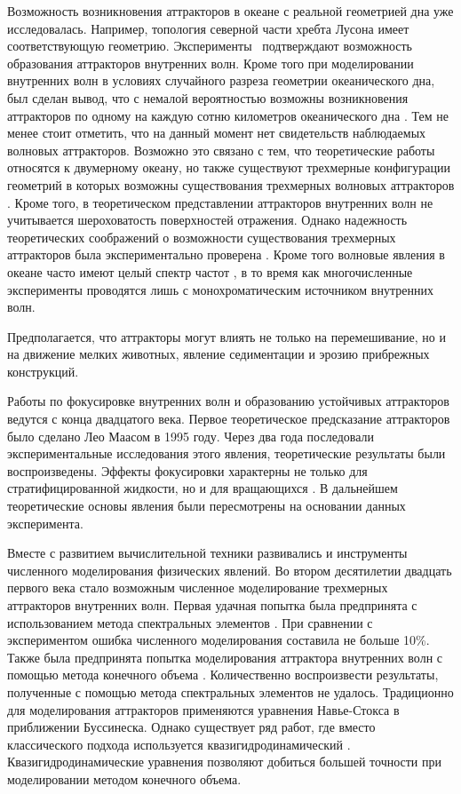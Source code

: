 Возможность возникновения аттракторов в океане с реальной геометрией дна уже исследовалась\cite{Tang2010}. Например, топология северной части хребта Лусона имеет соответствующую геометрию. Эксперименты~\cite{ECHEVERRI2011} подтверждают возможность образования аттракторов внутренних волн. Кроме того при моделировании внутренних волн в условиях случайного разреза геометрии океанического дна, был сделан вывод, что с немалой вероятностью возможны возникновения аттракторов по одному на каждую сотню километров океанического дна \cite{Guo2015}. Тем не менее стоит отметить, что на данный момент нет свидетельств наблюдаемых волновых аттракторов. Возможно это связано с тем, что теоретические работы \cite{Guo2015} относятся к двумерному океану, но также существуют трехмерные конфигурации геометрий в которых возможны существования трехмерных волновых аттракторов \cite{Drijfhout2007,Manders2004}. Кроме того, в теоретическом представлении аттракторов внутренних волн не учитывается шероховатость поверхностей отражения. Однако надежность теоретических соображений о возможности существования трехмерных аттракторов была экспериментально проверена \cite{Hazewinkel2010}. Кроме того волновые явления в океане часто имеют целый спектр частот \cite{Garrett1972}, в то время как многочисленные эксперименты проводятся лишь с монохроматическим источником внутренних волн.

Предполагается, что аттракторы могут влиять не только на перемешивание, но и на движение мелких животных, явление седиментации и эрозию прибрежных конструкций.

Работы по фокусировке внутренних волн и образованию устойчивых аттракторов ведутся с конца двадцатого века. Первое теоретическое предсказание аттракторов было сделано Лео Маасом в 1995 году\cite{Maas1995}. Через два года последовали экспериментальные исследования этого явления, теоретические результаты были воспроизведены\cite{Maas1997}. Эффекты фокусировки характерны не только для стратифицированной жидкости, но и для вращающихся \cite{articleMaas2003,Veronis1970}. В дальнейшем теоретические основы явления были пересмотрены на основании данных эксперимента\cite{Lam2008}.

Вместе с развитием вычислительной техники развивались и инструменты численного моделирования физических явлений. Во втором десятилетии двадцать первого века стало возможным численное моделирование трехмерных аттракторов внутренних волн. Первая удачная попытка была предпринята с использованием метода спектральных элементов \cite{Brouzet2016,Brouzet_2016}. При сравнении с экспериментом ошибка численного моделирования составила не больше 10\%. Также была предпринята попытка моделирования аттрактора внутренних волн с помощью метода конечного объема \cite{Brouzet2014}. Количественно воспроизвести результаты, полученные с помощью метода спектральных элементов не удалось.
Традиционно для моделирования аттракторов применяются уравнения Навье-Стокса в приближении Буссинеска. Однако существует ряд работ, где вместо классического подхода используется квазигидродинамический \cite{ElizarBook}. Квазигидродинамические уравнения позволяют добиться большей точности \cite{Kraposhin20182} при моделировании методом конечного объема.





